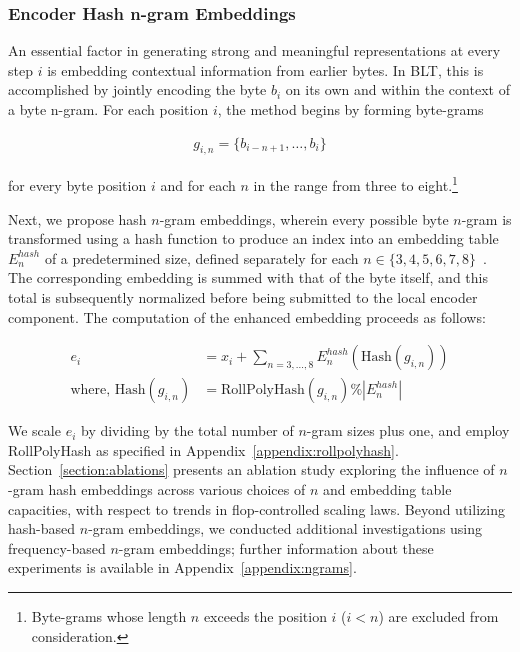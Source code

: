 \subsubsection{Encoder Hash n-gram Embeddings}
\label{sec:ngram-emb}
\label{sec:hash-emb}
An essential factor in generating strong and meaningful representations at every step $i$ is embedding contextual information from earlier bytes. In {\textsc BLT}, this is accomplished by jointly encoding the byte $b_i$ on its own and within the context of a byte n-gram. For each position $i$, the method begins by forming byte-grams

\begin{align}
    g_{i,n}=\{b_{i-n + 1},\ldots, b_i\}
\end{align}

for every byte position $i$ and for each $n$ in the range from three to eight.\footnote{
Byte-grams whose length $n$ exceeds the position $i$ ($i < n$) are excluded from consideration. }

Next, we propose hash $n$-gram embeddings, wherein every possible byte $n$-gram is transformed using a hash function to produce an index into an embedding table $E_{n}^{hash}$ of a predetermined size, defined separately for each $n \in\{3,4,5,6,7,8\}$~\citep{bai2010learning}. 
The corresponding embedding is summed with that of the byte itself, and this total is subsequently normalized before being submitted to the local encoder component. The computation of the enhanced embedding proceeds as follows:

\begin{align}
e_i &= x_i + \sum_{n = 3,...,8}E_{n}^{hash}(\text{Hash}(g_{i,n})) \\
\text{where, Hash}(g_{i,n}) &= \text{RollPolyHash}(g_{i,n}) \% |E_{n}^{hash}|
\end{align}

We scale $e_i$ by dividing by the total number of $n$-gram sizes plus one, and employ RollPolyHash as specified in Appendix~\ref{appendix:rollpolyhash}. Section~\ref{section:ablations} presents an ablation study exploring the influence of $n$-gram hash embeddings across various choices of $n$ and embedding table capacities, with respect to trends in flop-controlled scaling laws. Beyond utilizing hash-based $n$-gram embeddings, we conducted additional investigations using frequency-based $n$-gram embeddings; further information about these experiments is available in Appendix~\ref{appendix:ngrams}.

